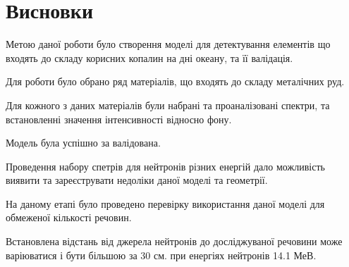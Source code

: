 \documentclass[a4paper, 14pt]{article}
\numberwithin{equation}{section}
\numberwithin{table}{section}
\begin{document}
\section{Висновки}
\setcounter{figure}{0}
Метою даної роботи було створення моделі для детектування елементів що входять до складу корисних копалин на дні океану, та її валідація.
	
Для роботи було обрано ряд матеріалів, що входять до складу металічних руд.

Для кожного з даних матеріалів були набрані та проаналізовані спектри, та встановленні значення інтенсивності відносно фону. 

Модель була успішно за валідована.

Проведення набору спетрів для нейтронів різних енергій дало можливість виявити та зареєструвати недоліки даної моделі та геометрії. 

На даному етапі було проведено перевірку використання даної моделі для обмеженої кількості речовин. 

Встановлена відстань від джерела нейтронів до досліджуваної речовини може варіюватися і бути більшою за 30 см. при енергіях нейтронів 14.1 МеВ.
	
	
\newpage 
\end{document}
